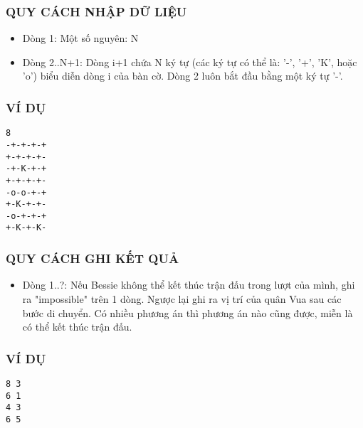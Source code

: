 \subsubsection{   QUY CÁCH NHẬP DỮ LIỆU  }
\begin{itemize}
	\item     Dòng 1: Một số nguyên: N   
	\item     Dòng 2..N+1: Dòng i+1 chứa N ký tự (các ký tự có thể là: '-', '+',         'K', hoặc 'o') biểu diễn dòng i của bàn cờ. Dòng 2 luôn          bắt đầu bằng một ký tự '-'.   
\end{itemize}

\subsubsection{   VÍ DỤ  }
\begin{verbatim}
8
-+-+-+-+
+-+-+-+-
-+-K-+-+
+-+-+-+-
-o-o-+-+
+-K-+-+-
-o-+-+-+
+-K-+-K-
\end{verbatim}

\subsubsection{   QUY CÁCH GHI KẾT QUẢ  }
\begin{itemize}
	\item     Dòng 1..?: Nếu Bessie không thể kết thúc trận đấu trong lượt của mình, ghi ra         "impossible" trên 1 dòng. Ngược lại ghi ra vị trí của quân Vua sau các bước         di chuyển. Có nhiều phương án thì phương án nào cũng được, miễn là          có thể kết thúc trận đấu.   
\end{itemize}

\subsubsection{   VÍ DỤ  }
\begin{verbatim}
8 3
6 1
4 3
6 5
\end{verbatim}